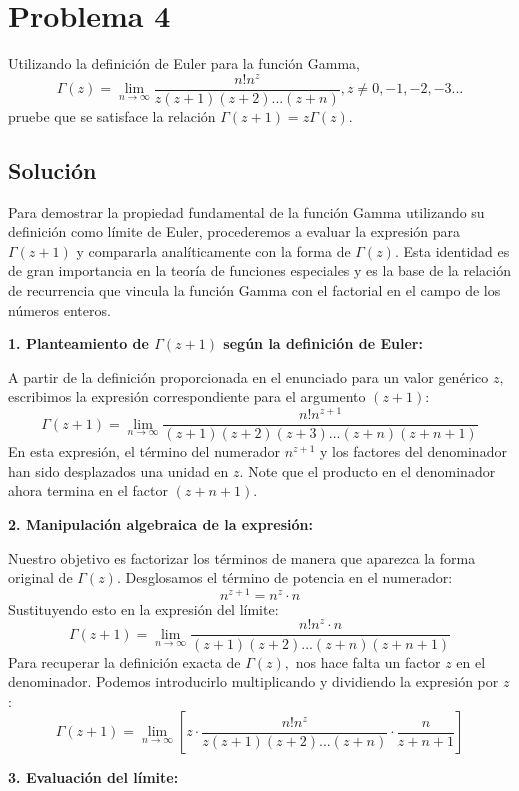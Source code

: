 \documentclass[a4paper]{article}
\begin{document}
\section{Problema 4}
Utilizando la definición de Euler para la función Gamma,
$$ \Gamma(z) = \lim_{n\to\infty} \frac{n! n^z}{z(z+1)(z+2)...(z+n)} , z \neq 0, -1, -2, -3... $$
pruebe que se satisface la relación $\Gamma(z+1) = z\Gamma(z).$

\subsection{Solución}

Para demostrar la propiedad fundamental de la función Gamma utilizando su definición como límite de Euler, procederemos a evaluar la expresión para $\Gamma(z+1)$ y compararla analíticamente con la forma de $\Gamma(z).$ Esta identidad es de gran importancia en la teoría de funciones especiales y es la base de la relación de recurrencia que vincula la función Gamma con el factorial en el campo de los números enteros.

\textbf{1. Planteamiento de $\Gamma(z+1)$ según la definición de Euler:}

A partir de la definición proporcionada en el enunciado para un valor genérico $z,$ escribimos la expresión correspondiente para el argumento $(z+1):$
$$ \Gamma(z+1) = \lim_{n\to\infty} \frac{n! n^{z+1}}{(z+1)(z+2)(z+3)...(z+n)(z+n+1)} $$
En esta expresión, el término del numerador $n^{z+1}$ y los factores del denominador han sido desplazados una unidad en $z.$ Note que el producto en el denominador ahora termina en el factor $(z+n+1).$

\textbf{2. Manipulación algebraica de la expresión:}

Nuestro objetivo es factorizar los términos de manera que aparezca la forma original de $\Gamma(z).$ Desglosamos el término de potencia en el numerador:
$$ n^{z+1} = n^z \cdot n $$
Sustituyendo esto en la expresión del límite:
$$ \Gamma(z+1) = \lim_{n\to\infty} \frac{n! n^z \cdot n}{(z+1)(z+2)...(z+n)(z+n+1)} $$
Para recuperar la definición exacta de $\Gamma(z),$ nos hace falta un factor $z$ en el denominador. Podemos introducirlo multiplicando y dividiendo la expresión por $z$:
$$ \Gamma(z+1) = \lim_{n\to\infty} \left[ z \cdot \frac{n! n^z}{z(z+1)(z+2)...(z+n)} \cdot \frac{n}{z+n+1} \right] $$

\textbf{3. Evaluación del límite:}
\end{document}
